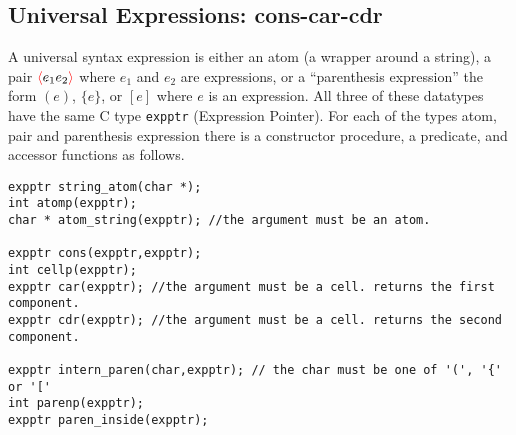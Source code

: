 \documentclass{article}
\newcommand{\fopen}{{\color{red} \langle}}
\newcommand{\fclose}{{\color{red} \rangle}}
\begin{document}
\subsection{Universal Expressions: cons-car-cdr}

A universal syntax expression is either an atom (a wrapper around a string),
a pair $\fopen e_1 e_2 \fclose$ where $e_1$ and $e_2$ are expressions, or a ``parenthesis expression'' the form $(e)$,
$\{ e\}$, or $[e]$ where $e$ is an expression.   All three of these datatypes have the same C type {\tt expptr} (Expression Pointer).
For each of the types atom, pair and parenthesis expression there is a constructor procedure, a predicate, and accessor functions as follows.

\begin{verbatim}
expptr string_atom(char *);
int atomp(expptr);
char * atom_string(expptr); //the argument must be an atom.

expptr cons(expptr,expptr);
int cellp(expptr);
expptr car(expptr); //the argument must be a cell. returns the first component.
expptr cdr(expptr); //the argument must be a cell. returns the second component.

expptr intern_paren(char,expptr); // the char must be one of '(', '{' or '['
int parenp(expptr);
expptr paren_inside(expptr);
\end{verbatim}
\end{document}
